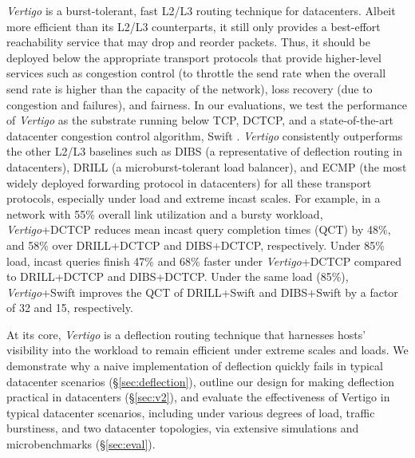 \textit{Vertigo} is a burst-tolerant, fast L2/L3 routing technique for datacenters. Albeit more efficient than its L2/L3 counterparts, it still only provides a best-effort reachability service that may drop and reorder packets. Thus, it should be deployed below the appropriate transport protocols that provide higher-level services such as congestion control (\eg to throttle the send rate when the overall send rate is higher than the capacity of the network), loss recovery (due to congestion and failures), and fairness. In our evaluations, we test the performance of \textit{Vertigo} as the substrate running below TCP, DCTCP, and a state-of-the-art datacenter congestion control algorithm, Swift \cite{swift}. \textit{Vertigo} consistently outperforms the other L2/L3 baselines such as DIBS \cite{dibs} (a representative of deflection routing in datacenters), DRILL \cite{drill} (a microburst-tolerant load balancer), and ECMP (the most widely deployed forwarding protocol in datacenters) for all these transport protocols, especially under load and extreme incast scales. For example, in a network with 55\% overall link utilization and a bursty workload, \textit{Vertigo}+DCTCP reduces mean incast query completion times (QCT) by 48\%, and 58\% over DRILL+DCTCP and DIBS+DCTCP, respectively. Under 85\% load, incast queries finish 47\% and 68\% faster under \textit{Vertigo}+DCTCP compared to DRILL+DCTCP and DIBS+DCTCP. Under the same load (85\%), \textit{Vertigo}+Swift improves the QCT of DRILL+Swift and DIBS+Swift by a factor of 32 and 15, respectively.

At its core, \textit{Vertigo} is a deflection routing technique that harnesses hosts' visibility into the workload to remain efficient under extreme scales and loads. We demonstrate why a naive implementation of deflection quickly fails in typical datacenter scenarios (\S\ref{sec:deflection}), outline our design for making deflection practical in datacenters (\S\ref{sec:v2}), and evaluate the effectiveness of Vertigo in typical datacenter scenarios, including under various degrees of load, traffic burstiness, and two datacenter topologies, via extensive simulations and microbenchmarks (\S\ref{sec:eval}).

